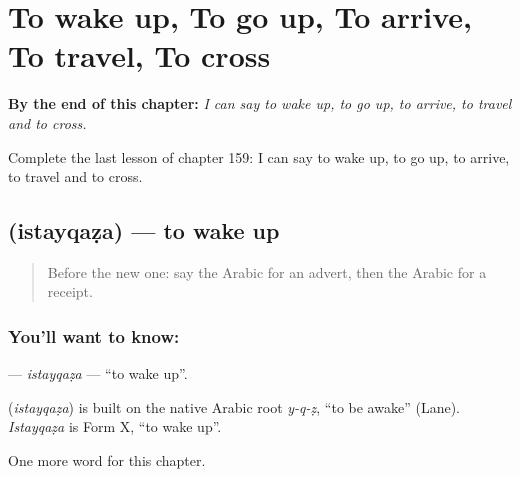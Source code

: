 
\chapter{To wake up, To go up, To arrive, To travel, To cross}
\label{ch:ar-to-wake-up-to-go-up-to-arrive-to-travel-to-cross}

\begin{chapteropening}
\textbf{By the end of this chapter:} \emph{I can say to wake up, to go up, to arrive, to travel and to cross.}

Complete the last lesson of chapter 159: I can say to wake up, to go up, to arrive, to travel and to cross.
\end{chapteropening}

\section[\texorpdfstring{\ar{استيقظ} (istayqaẓa)}{استيقظ (istayqaẓa)}]{ (istayqaẓa) — to wake up}

\label{lesson:AR-C159-istayqaza}



\begin{quote}
Before the new one: say the Arabic for an advert, then the Arabic for a receipt.
\end{quote}

\subsection*{You'll want to know: }
\textbf{} — \emph{istayqaẓa} — \textquotedblleft{}to wake up\textquotedblright{}.

\begin{cousinweb}
\textbf{} (\emph{istayqaẓa}) is built on the native Arabic root \emph{y-q-ẓ}, \textquotedblleft{}to be awake\textquotedblright{} (Lane). \emph{Istayqaẓa} is Form X, \textquotedblleft{}to wake up\textquotedblright{}.
\end{cousinweb}

\begin{grammarlens}[title={What you've built}]
One more word for this chapter.
\end{grammarlens}

